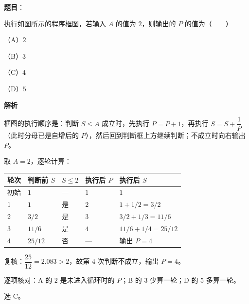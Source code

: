 \begin{answer}

\textbf{题目}：

执行如图所示的程序框图，若输入 $A$ 的值为 $2$，则输出的 $P$ 的值为\mbox{（　　）}

（A）$2$

（B）$3$

（C）$4$

（D）$5$
\nopagebreak[4]
\begin{center}\end{center}
\nopagebreak[4]
\textbf{解析}

框图的执行顺序是：判断 $S\leqslant A$ 成立时，先执行 $P=P+1$，再执行 $S=S+\dfrac1P$（此时分母已是自增后的 $P$），然后回到判断框上方继续判断；不成立时向右输出 $P$。

取 $A=2$，逐轮计算：

\begin{center}
\begin{tabular}{lllll}
\toprule
轮次 & 判断前 $S$ & $S\leqslant2$ & 执行后 $P$ & 执行后 $S$ \\
\midrule
初始 & $1$ & — & $1$ & $1$ \\
1 & $1$ & 是 & $2$ & $1+1/2=3/2$ \\
2 & $3/2$ & 是 & $3$ & $3/2+1/3=11/6$ \\
3 & $11/6$ & 是 & $4$ & $11/6+1/4=25/12$ \\
4 & $25/12$ & 否 & — & 输出 $P=4$ \\
\bottomrule
\end{tabular}
\end{center}

复核：$\dfrac{25}{12}=2.083>2$，故第 4 次判断不成立，输出 $P=4$。

逐项核对：A 的 $2$ 是未进入循环时的 $P$；B 的 $3$ 少算一轮；D 的 $5$ 多算一轮。

选 C。


\end{answer}
